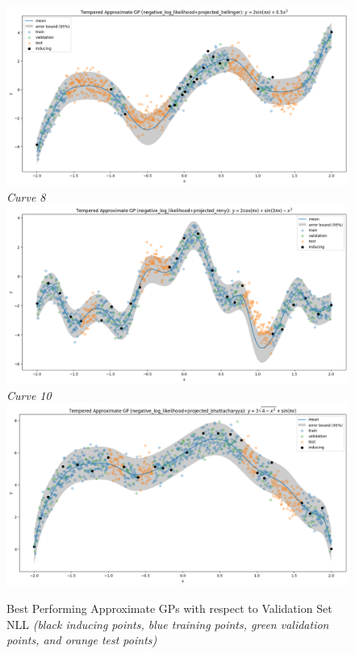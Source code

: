 \documentclass{article}
\numberwithin{equation}{section}
\begin{document}
\begin{figure}[h!]
\begin{minipage}{.5\textwidth}
  \includegraphics[width=\linewidth, trim={0 0 0 0.86cm},clip]{thesis_report/figures/toy_curves/curve5.png}
  \textit{Curve 8}
  \includegraphics[width=\linewidth, trim={0 0 0 0.85cm},clip]{thesis_report/figures/toy_curves/curve7.png}
  \textit{Curve 10}
  \includegraphics[width=\linewidth, trim={0 0 0 1.05cm},clip]{thesis_report/figures/toy_curves/curve9.png}
  \end{minipage}%
\caption{Best Performing Approximate GPs with respect to Validation Set NLL \textit{(black inducing points, blue training points, green validation points, and orange test points)}}
\label{figure:toy-curves-gps}
\end{figure}
\end{document}
